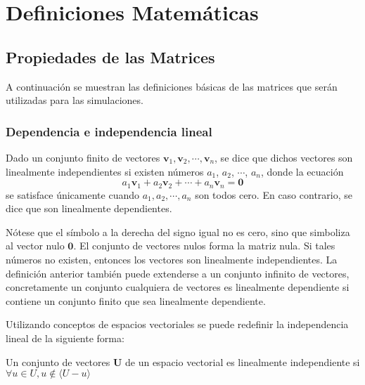 
\chapter{Definiciones Matemáticas} %

\label{AppendixB} %


\section{Propiedades de las Matrices}

A continuación se muestran las definiciones básicas de las matrices que serán utilizadas para las simulaciones.

\subsection{Dependencia e independencia lineal}

Dado un conjunto finito de vectores $\mathbf{v}_1, \mathbf{v}_2,\cdots, \mathbf{v}_n$, se dice que dichos vectores son linealmente
independientes si existen números $a_1$, $a_2$, $\cdots$, $a_n$, donde la ecuación
$$
 a_1 \mathbf{v}_1 + a_2 \mathbf{v}_2 + \cdots + a_n \mathbf{v}_n = \mathbf{0} 
$$
se satisface únicamente cuando $a_1, a_2,\cdots, a_n$ son todos cero. En caso contrario, se dice que son linealmente dependientes.

Nótese que el símbolo a la derecha del signo igual no es cero, sino que simboliza al vector nulo $\mathbf{0}$. El conjunto de
vectores nulos forma la matriz nula. Si tales números no existen, entonces los vectores son linealmente independientes. La 
definición anterior también puede extenderse a un conjunto infinito de vectores, concretamente un conjunto cualquiera de 
vectores es linealmente dependiente si contiene un conjunto finito que sea linealmente dependiente.

Utilizando conceptos de espacios vectoriales se puede redefinir la independencia lineal de la siguiente forma:

Un conjunto de vectores $\textbf{U}$ de un espacio vectorial es linealmente independiente si 
$\forall u \in U, u \notin \langle U - u \rangle$

